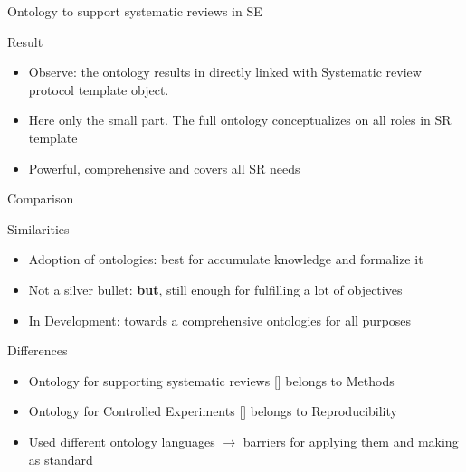 \documentclass[16:9,en,navbarside]{sdqbeamer}
\begin{document}
\begin{frame}{Ontology to support systematic reviews in SE}
\begin{block}{Result}  
    \begin{itemize}
        \item Observe: the ontology results in directly linked with Systematic review protocol template object.
        \pause
        \item Here only the small part. The full ontology conceptualizes on all roles in SR template
        \pause
        \item Powerful, comprehensive and covers all SR needs
    \end{itemize}
\end{block}
\end{frame}

\begin{frame}{Comparison}
\begin{block}{Similarities}
    \begin{itemize}
        \item<1-> Adoption of ontologies: best for accumulate knowledge and formalize it
        \item<2-> Not a silver bullet: \textbf{but}, still enough for fulfilling a lot of objectives
        \item<3-> In Development: towards a comprehensive ontologies for all purposes
    \end{itemize}
\end{block}
\pause
\begin{block}{Differences}
\begin{itemize}
    \item<4-> Ontology for supporting systematic reviews [\cite{Bio07}] belongs to Methods
    \item<5-> Ontology for Controlled Experiments [\cite{Gar08}] belongs to Reproducibility
    \item<6->  Used different ontology languages $\rightarrow$ barriers for applying them and making as standard 
    
\end{itemize}
\end{block}
\end{frame}
\end{document}
